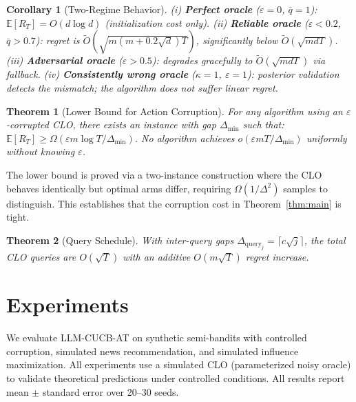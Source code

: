 \documentclass{article}
\newtheorem{theorem}{Theorem}
\newtheorem{corollary}{Corollary}
\newcommand{\E}{\mathbb{E}}
\newcommand{\Dquery}{\Delta_{\mathrm{query}}}
\begin{document}
\begin{corollary}[Two-Regime Behavior]
\label{cor:two_regime}
(i) \textbf{Perfect oracle} ($\varepsilon = 0$, $\bar{q} = 1$): $\E[R_T] = O(d\log d)$ (initialization cost only).
(ii) \textbf{Reliable oracle} ($\varepsilon < 0.2$, $\bar{q} > 0.7$): regret is $\tilde{O}(\sqrt{m(m + 0.2\sqrt{d})T})$, significantly below $\tilde{O}(\sqrt{mdT})$.
(iii) \textbf{Adversarial oracle} ($\varepsilon > 0.5$): degrades gracefully to $\tilde{O}(\sqrt{mdT})$ via fallback.
(iv) \textbf{Consistently wrong oracle} ($\kappa=1$, $\varepsilon=1$): posterior validation detects the mismatch; the algorithm does not suffer linear regret.
\end{corollary}

\begin{theorem}[Lower Bound for Action Corruption]
\label{thm:lower_bound}
For any algorithm using an $\varepsilon$-corrupted CLO, there exists an instance with gap $\Delta_{\min}$ such that:
$\E[R_T] \geq \Omega(\varepsilon m \log T / \Delta_{\min})$.
No algorithm achieves $o(\varepsilon m T / \Delta_{\min})$ uniformly without knowing $\varepsilon$.
\end{theorem}

The lower bound is proved via a two-instance construction where the CLO behaves identically but optimal arms differ, requiring $\Omega(1/\Delta^2)$ samples to distinguish.
This establishes that the corruption cost in Theorem~\ref{thm:main} is tight.

\begin{theorem}[Query Schedule]
\label{thm:query_schedule}
With inter-query gaps $\Dquery_j = \lceil c\sqrt{j}\rceil$, the total CLO queries are $O(\sqrt{T})$ with an additive $O(m\sqrt{T})$ regret increase.
\end{theorem}

\section{Experiments}
\label{sec:experiments}

We evaluate LLM-CUCB-AT on synthetic semi-bandits with controlled corruption, simulated news recommendation, and simulated influence maximization.
All experiments use a simulated CLO (parameterized noisy oracle) to validate theoretical predictions under controlled conditions.
All results report mean $\pm$ standard error over 20--30 seeds.
\end{document}
